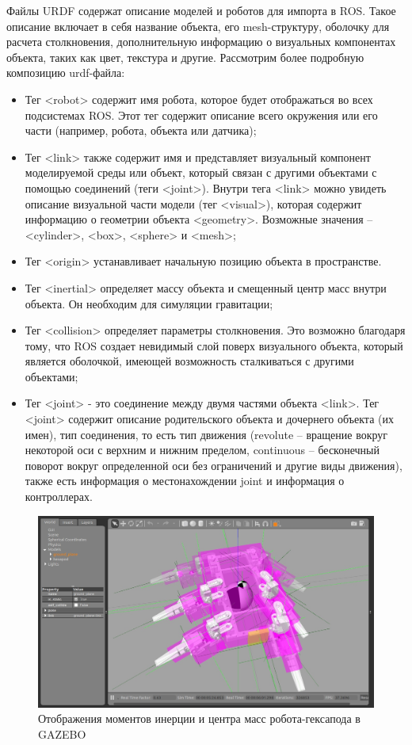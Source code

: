 Файлы URDF содержат описание моделей и роботов для импорта в ROS. Такое описание включает в себя название объекта, его mesh-структуру, оболочку для расчета столкновения, дополнительную информацию о визуальных компонентах объекта, таких как цвет, текстура и другие. Рассмотрим более подробную композицию urdf-файла:

\begin{itemize}
	\item Тег <robot> содержит имя робота, которое будет отображаться во всех подсистемах ROS. Этот тег содержит описание всего окружения или его части (например, робота, объекта или датчика);
	\item Тег <link> также содержит имя и представляет визуальный компонент моделируемой среды или объект, который связан с другими объектами с помощью соединений (теги <joint>). Внутри тега <link> можно увидеть описание визуальной части модели (тег <visual>), которая содержит информацию о геометрии объекта <geometry>. Возможные значения – <cylinder>, <box>, <sphere> и <mesh>;
	\item Тег <origin> устанавливает начальную позицию объекта в пространстве.
	\item Тег <inertial> определяет массу объекта и смещенный центр масс внутри объекта. Он необходим для симуляции гравитации;
	\item Тег <collision> определяет параметры столкновения. Это возможно благодаря тому, что ROS создает невидимый слой поверх визуального объекта, который является оболочкой, имеющей возможность сталкиваться с другими объектами;
	\item Тег <joint> - это соединение между двумя частями объекта <link>. Тег <joint> содержит описание родительского объекта и дочернего объекта (их имен), тип соединения, то есть тип движения (revolute – вращение вокруг некоторой оси с верхним и нижним пределом, continuous – бесконечный поворот вокруг определенной оси без ограничений и другие виды движения), также есть информация о местонахождении joint и информация о контроллерах.
\end{itemize}

\begin{figure}[h!]
	\centering
	\includegraphics[width = \linewidth]{img/gazebocmi}
	\caption{Отображения моментов инерции и центра масс робота-гексапода в GAZEBO}
	\label{img:gazebocmi}
\end{figure}


